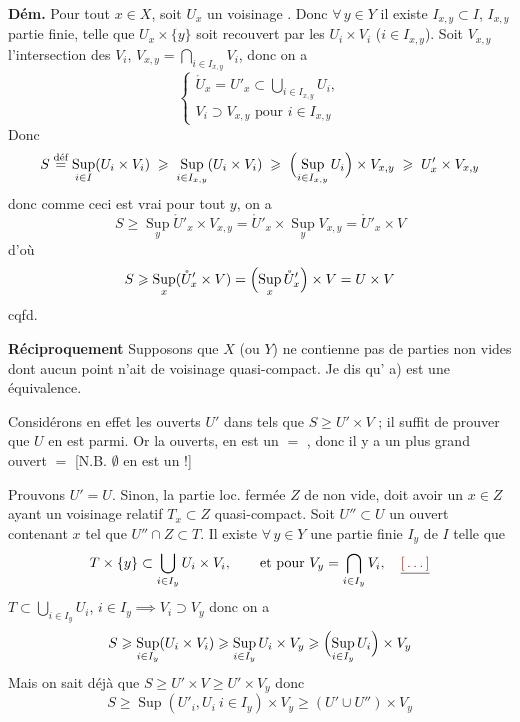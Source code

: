 \documentclass[11pt,a4paper]{article}
\begin{document}
\textbf{Dém.} Pour tout $x \in X$, soit $U_{x}$ un voisinage
. Donc $\forall\, y \in Y$ il existe
$I_{x,y} \subset I$, $I_{x,y}$ partie finie, telle que \struck{\ill{}}
$U_{x} \times \{y\}$ soit recouvert par les $U_{i} \times V_{i}$
($i \in I_{x,y}$). Soit $V_{x,y}$ l'intersection \struck{\ill{}} des $V_{i}$,
$V_{x,y} = \bigcap_{i \in I_{x,y}} V_{i}$, donc on a
\[
\begin{cases}
\mathring{U}_{x} = U'_{x} \subset \bigcup_{i \in I_{x,y}} U_{i}, \\
V_{i} \supset V_{x,y} \text{ pour } i \in I_{x,y}
\end{cases}
\]
Donc
\[
S \overset{\text{déf}}{=} \operatorname*{Sup}_{i \in I}(U_{i} \times V_{i})
\;\geqslant\; \operatorname*{Sup}_{i \in I_{x,y}}(U_{i} \times V_{i})
\;\geqslant\; \Bigl(\operatorname*{Sup}_{i \in I_{x,y}} U_{i}\Bigr) \times V_{x,y}
\;\geqslant\; U'_{x} \times V_{x,y}
\]
donc comme ceci est vrai pour tout $y$, on a
\[
S \geqslant \operatorname*{Sup}_{y} \mathring{U}'_{x} \times V_{x,y}
= \mathring{U}'_{x} \times \operatorname*{Sup}_{y} V_{x,y}
= \mathring{U}'_{x} \times V
\]
d'où
\[
S \geqslant \operatorname*{Sup}_{x} (\mathring{U}'_{x} \times V)
= \Bigl(\operatorname*{Sup}_{x} \mathring{U}'_{x}\Bigr) \times V
= U \times V
\]
cqfd.

\textbf{Réciproquement} Supposons que $X$ (ou $Y$) ne contienne pas de parties
 non vides dont aucun point n'ait de voisinage
 quasi-compact. Je dis qu' a) est une équivalence.

Considérons en effet les ouverts $U'$ dans  tels que $S \geqslant
U' \times V$ ; il suffit de prouver que $U$ en est parmi. Or la
\struck{\ill{}} \ill{} ouverts, en est un $=$ , donc il y a un
plus grand ouvert \ill{} $=$  [N.B. $\emptyset$ en est un !]

Prouvons $U' = U$.  Sinon, la partie loc. fermée $Z$ de
 \struck{\ill{}} non vide, doit avoir un $x \in Z$ ayant un
voisinage relatif $T_{x} \subset Z$ quasi-compact. Soit $U'' \subset U$ un
ouvert contenant $x$ tel que $U'' \cap Z \subset T$.  Il existe
$\forall\, y \in Y$ une partie finie $I_{y}$ de $I$ telle que
\[
T \times \{y\} \subset \bigcup_{i \in I_{y}} U_{i} \times V_{i},
\qquad\text{et pour } V_{y} = \bigcap_{i \in I_{y}} V_{i},
\quad \struck{\ill{}}
\]
$T \subset \bigcup_{i \in I_{y}} U_{i}$, $i \in I_{y} \implies V_{i} \supset
V_{y}$ donc on a
\[
S \geqslant \operatorname*{Sup}_{i \in I_{y}}(U_{i} \times V_{i})
\geqslant \operatorname*{Sup}_{i \in I_{y}} U_{i} \times V_{y}
\geqslant \Bigl(\operatorname*{Sup}_{i \in I_{y}} U_{i}\Bigr) \times V_{y}
\]
Mais on sait déjà que $S \geqslant U' \times V \geqslant U' \times V_{y}$ donc
\[
S \geqslant \operatorname*{Sup}(U'_{i}, U_{i}\ i \in I_{y}) \times V_{y}
\geqslant (U' \cup U'') \times V_{y}
\]
\end{document}
